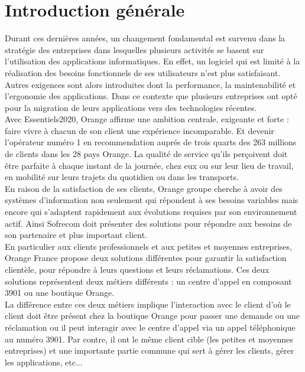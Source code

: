 \chapter*{Introduction générale}
Durant ces dernières années, un changement fondamental est survenu dans la stratégie des entreprises dans lesquelles plusieurs activités se basent sur l'utilisation des applications informatiques. En effet, un logiciel qui est limité à la réalisation des besoins fonctionnels de ses utilisateurs n'est plus satisfaisant. Autres exigences sont alors introduites dont la performance, la maintenabilité et l'ergonomie des applications. Dans ce contexte que plusieurs entreprises ont opté pour la migration de leurs applications vers des technologies récentes.\\ \newline
Avec Essentiels2020\cite{essentiels2020}, Orange affirme une ambition centrale, exigeante et forte : faire vivre à chacun de son client une expérience incomparable. Et devenir l’opérateur numéro 1 en recommendation auprés de trois quarts des 263 millions de clients dans les 28 pays Orange. La qualité de service qu’ils perçoivent doit être parfaite à chaque instant de la journée, chez eux ou sur leur lieu de travail, en mobilité sur leurs trajets du quotidien ou dans les transports.\\ \newline
En raison de la satisfaction de ses clients, Orange groupe cherche à avoir des systèmes d'information non seulement qui répondent à ses besoins variables mais encore qui s'adaptent rapidement aux évolutions requises par son environnement actif. Ainsi Sofrecom doit présenter des solutions pour répondre aux besoins de son partenaire et plus important client.\\ \newline
En particulier aux clients professionnels et aux petites et moyennes entreprises, Orange  France propose deux solutions différentes pour garantir la satisfaction clientèle, pour répondre à leurs questions et leurs réclamations. Ces deux solutions représentent deux métiers différents : un centre d’appel en composant 3901 ou une boutique Orange.\\ \newline
La différence entre ces deux métiers implique l’interaction avec le client d’où le client doit être présent chez la boutique Orange pour passer une demande ou une réclamation ou il peut interagir avec le centre d’appel  via un appel téléphonique au numéro 3901. Par contre, il ont le même client cible (les petites et moyennes entreprises) et une importante partie commune qui sert à gérer les clients, gérer les applications, etc...
